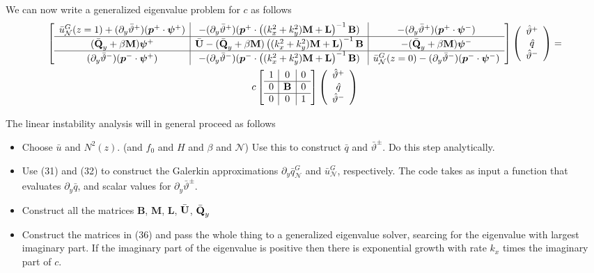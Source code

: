 \documentclass[10pt]{article}
\newcommand{\pd}[1]{\partial_{#1}}
\newcommand{\sN}{\mathcal{N}}
\newcommand{\mat}[1]{\text{\bf #1}}
\begin{document}
We can now write a generalized eigenvalue problem for $c$ as follows
\begin{multline}
\left[\begin{array}{c|c|c}
\bar{u}_\sN^G(z=1)+(\pd{y}\bar\vartheta^+)(\bm{p}^+\cdot\bm{\psi}^+)&-(\pd{y}\bar\vartheta^+)(\bm{p}^+\cdot\left((k_x^2+k_y^2)\mat{M}+\mat{L}\right)^{-1}\mat{B})&-(\pd{y}\bar\vartheta^+)(\bm{p}^+\cdot\bm{\psi}^-)\\\hline
(\bar{\mat{Q}}_y+\beta\mat{M})\bm{\psi}^+&\bar{\mat{U}} -(\bar{\mat{Q}}_y+\beta\mat{M})\left((k_x^2+k_y^2)\mat{M}+\mat{L}\right)^{-1} \mat{B}&-(\bar{\mat{Q}}_y+\beta\mat{M})\bm{\psi}^-\\\hline
 (\pd{y}\bar\vartheta^-)(\bm{p}^-\cdot\bm{\psi}^+)&-(\pd{y}\bar\vartheta^-)(\bm{p}^-\cdot\left((k_x^2+k_y^2)\mat{M}+\mat{L}\right)^{-1}\mat{B})&\bar{u}_\sN^G(z=0)-(\pd{y}\bar\vartheta^-)(\bm{p}^-\cdot\bm{\psi}^-)
\end{array}\right]\left(\begin{array}{c}\hat{\vartheta}^+\\\hat{q}\\\hat{\vartheta}^-\end{array}\right) = \\
c\left[\begin{array}{c|c|c}
1&0&0\\\hline
0&\mat{B}&0\\\hline
0&0&1
\end{array}\right]\left(\begin{array}{c}\hat{\vartheta}^+\\\hat{q}\\\hat{\vartheta}^-\end{array}\right)
\end{multline}

The linear instability analysis will in general proceed as follows
\begin{itemize}
\item Choose $\bar{u}$ and $N^2(z)$. (and $f_0$ and $H$ and $\beta$ and $\sN$) Use this to construct $\bar{q}$ and $\bar{\vartheta}^\pm$. Do this step analytically.
\item Use (31) and (32) to construct the Galerkin approximations $\pd{y}\bar q_\sN^G$ and $\bar u_\sN^G$, respectively. The code takes as input a function that evaluates $\pd{y}\bar{q}$, and scalar values for $\pd{y}\bar\vartheta^\pm$.
\item Construct all the matrices {\bf B}, {\bf M}, {\bf L}, $\bar{\mat{U}}$, $\bar{\mat{Q}}_y$
\item Construct the matrices in (36) and pass the whole thing to a generalized eigenvalue solver, searcing for the eigenvalue with largest imaginary part. If the imaginary part of the eigenvalue is positive then there is exponential growth with rate $k_x$ times the imaginary part of $c$.
\end{itemize}
\end{document}
